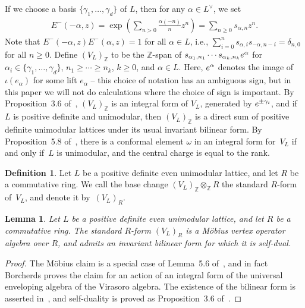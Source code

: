 \documentclass[11pt]{article}
\newcommand{\bZ}{\mathbb{Z}}
\newtheorem{lem}[thm]{Lemma}
\theoremstyle{definition}
\newtheorem{defn}[thm]{Definition}
\begin{document}
If we choose a basis $\{ \gamma_1,\ldots,\gamma_d\}$ of $L$, then for any $\alpha \in L^\vee$, we set
\begin{gather*} E^-(-\alpha,z) = \exp \left( \sum_{n > 0} \frac{\alpha(-n)}{n}z^n \right) = \sum_{n \geq 0} s_{\alpha, n} z^n. \end{gather*}
Note that $E^-(-\alpha,z)E^-(\alpha,z) = 1$ for all $\alpha \in L$, i.e., $\sum\limits_{i=0}^n s_{\alpha,i} s_{-\alpha,n-i} = \delta_{n,0}$ for all $n \geq 0$. Define $(V_L)_{\bZ}$ to be the $\bZ$-span of $s_{\alpha_1,n_1} \cdots s_{\alpha_k,n_k} {\rm e}^\alpha$ for $\alpha_i \in \{ \gamma_1,\ldots,\gamma_d\}$, $n_1 \geq \cdots \geq n_k$, $k \geq 0$, and $\alpha \in L$. Here, ${\rm e}^\alpha$ denotes the image of $\iota(e_\alpha)$ for some lift $e_\alpha$ -- this choice of notation has an ambiguous sign, but in this paper we will not do calculations where the choice of sign is important. By Proposition~3.6 of~\cite{DG12}, $(V_L)_{\bZ}$ is an integral form of $V_L$, generated by ${\rm e}^{\pm\gamma_i}$, and if~$L$ is positive definite and unimodular, then $(V_L)_{\bZ}$ is a direct sum of positive definite unimodular lattices under its usual invariant bilinear form. By Proposition~5.8 of~\cite{M14}, there is a conformal element $\omega$ in an integral form for~$V_L$ if and only if~$L$ is unimodular, and the central charge is equal to the rank.

\begin{defn}Let $L$ be a positive definite even unimodular lattice, and let $R$ be a commutative ring. We call the base change $(V_L)_{\bZ} \otimes_{\bZ} R$ the standard $R$-form of~$V_L$, and denote it by~$(V_L)_R$.
\end{defn}

\begin{lem} \label{lem:standard-R-form}Let $L$ be a positive definite even unimodular lattice, and let $R$ be a commutative ring. The standard $R$-form $(V_L)_R$ is a M\"obius vertex operator algebra over $R$, and admits an invariant bilinear form for which it is self-dual.
\end{lem}
\begin{proof}The M\"obius claim is a special case of Lemma~5.6 of~\cite{B99}, and in fact Borcherds proves the claim for an action of an integral form of the universal enveloping algebra of the Virasoro algebra. The existence of the bilinear form is asserted in~\cite{B86}, and self-duality is proved as Proposition~3.6 of~\cite{DG12}.
\end{proof}
\end{document}
